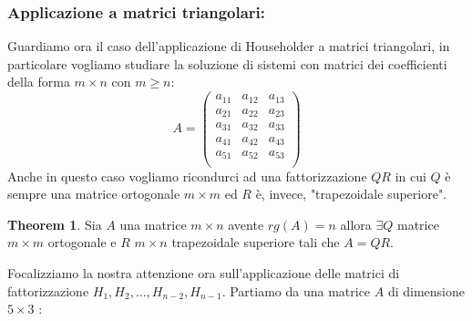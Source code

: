 \documentclass[12pt, a4paper]{book}
\theoremstyle{definition}
\newtheorem{theorem}{Theorem}
\begin{document}
\begin{flushleft}
\subsubsection{Applicazione a matrici triangolari: }
Guardiamo ora il caso dell'applicazione di Householder a matrici triangolari, in particolare vogliamo studiare la soluzione di sistemi con matrici dei coefficienti della forma $m \times n$ con $ m \geq n $:
\[
	A = 
	\begin{pmatrix}
		a_{11} & a_{12} & a_{13} \\
		a_{21} & a_{22} & a_{23} \\
		a_{31} & a_{32} & a_{33} \\
		a_{41} & a_{42} & a_{43} \\
		a_{51} & a_{52} & a_{53} \\
	\end{pmatrix}
\]
Anche in questo caso vogliamo ricondurci ad una fattorizzazione $QR$ in cui $Q$ è sempre una matrice ortogonale $m \times m$ ed $R$ è, invece,  "trapezoidale superiore".   

\begin{figure}[h!]
	\centering
\end{figure}

\newpage
\begin{theorem}
	Sia $A$ una matrice $m \times n$  avente $rg(A) = n$ allora $\exists Q$ matrice $m \times m$ ortogonale e $R$ $m \times n$ trapezoidale superiore tali che $A = QR$.
\end{theorem}

Focalizziamo la nostra attenzione ora sull'applicazione delle matrici di fattorizzazione $H_{1}, H_{2}, \dots, H_{n-2}, H_{n-1}$.  Partiamo da una matrice $A$ di dimensione $5 \times 3$ :


\end{flushleft}
\end{document}
